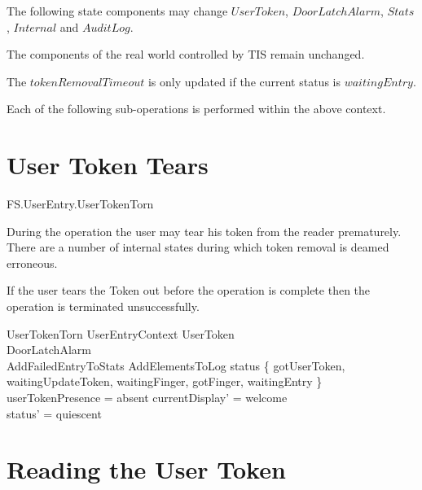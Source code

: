 \begin{Zcomment}
\item
The following state components may change $UserToken$,
$DoorLatchAlarm$, $Stats$, $Internal$ and $AuditLog$.
\item
The components of the real world controlled by TIS remain unchanged.
\item
The $tokenRemovalTimeout$ is only updated if the current status is
$waitingEntry$.
\end{Zcomment}

Each of the following sub-operations is performed within the above context.

\section{User Token Tears}

\begin{traceunit}{FS.UserEntry.UserTokenTorn}
\end{traceunit}


During the operation the user may tear his token from the reader
prematurely. There are a number of internal states during which token
removal is deamed erroneous.

If the user tears the Token out before the operation is complete then
the operation is terminated unsuccessfully.

\begin{schema}{UserTokenTorn}
        UserEntryContext
\also
	\Xi UserToken
\\      \Xi DoorLatchAlarm
\\      AddFailedEntryToStats
\also
        AddElementsToLog     
\where
        status \in \{ gotUserToken, waitingUpdateToken,
waitingFinger, gotFinger, waitingEntry \}
\\      userTokenPresence = absent
\also
        currentDisplay' = welcome
\\      status' = quiescent 
\end{schema}

\section{Reading the User Token}

